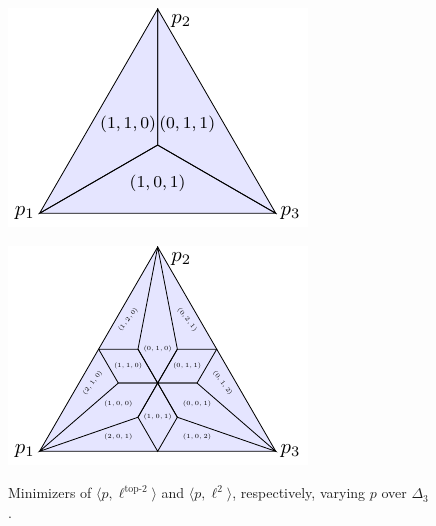\documentclass[12pt]{article}
\newcommand{\inprod}[2]{\langle #1, #2 \rangle}%
\newcommand{\elltop}[1]{\ell^{\text{top-$#1$}}}
\begin{document}
\begin{figure}[H]
	\begin{minipage}{0.45\linewidth}
		\centering
		\includegraphics[width=\linewidth]{tikz/original-top-k}
		\label{fig:original-top-k}
	\end{minipage}
	\hfill
	\begin{minipage}{0.45\linewidth}
		\centering
		\includegraphics[width=\linewidth]{tikz/finite-surrogate-top-k}
		\label{fig:finite-surrogate-top-k}
	\end{minipage}
	\caption{Minimizers of $\inprod{p}{\elltop{2}}$ and $\inprod{p}{\ell^2}$, respectively, varying $p$ over $\Delta_3$.}
	\label{fig:top-k-simplices}
\end{figure}
\end{document}
